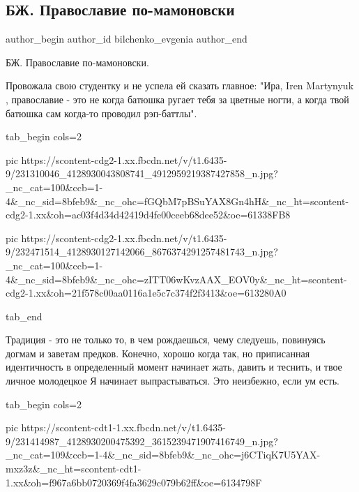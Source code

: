  
 
 
 
 
 
\subsection{БЖ. Православие по-мамоновски}
\label{sec:06_08_2021.fb.bilchenko_evgenia.3.pravoslavie_po_mamonovski}
 
\ifcmt
 author_begin
   author_id bilchenko_evgenia
 author_end
\fi

БЖ. Православие по-мамоновски.

Провожала свою студентку и не успела ей сказать главное: "Ира, Iren Martynyuk ,
православие - это не когда батюшка ругает тебя за цветные ногти, а когда твой
батюшка сам когда-то проводил рэп-баттлы".

\ifcmt
  tab_begin cols=2

     pic https://scontent-cdg2-1.xx.fbcdn.net/v/t1.6435-9/231310046_4128930043808741_4912959219387427858_n.jpg?_nc_cat=100&ccb=1-4&_nc_sid=8bfeb9&_nc_ohc=fGQbM7pBSuYAX8Gn4hH&_nc_ht=scontent-cdg2-1.xx&oh=ac03f4d34d42419d4fe00ceeb68dee52&oe=61338FB8

     pic https://scontent-cdg2-1.xx.fbcdn.net/v/t1.6435-9/232471514_4128930127142066_8676374291257481743_n.jpg?_nc_cat=100&ccb=1-4&_nc_sid=8bfeb9&_nc_ohc=zITT06wKvzAAX_EOV0y&_nc_ht=scontent-cdg2-1.xx&oh=21f578c00aa0116a1e5c7c374f2f3413&oe=613280A0

  tab_end
\fi

Традиция - это не только то, в чем рождаешься, чему следуешь, повинуясь догмам
и заветам предков. Конечно, хорошо когда так, но приписанная идентичность в
определенный момент начинает жать, давить и теснить, и твое личное молодецкое Я
начинает выпрастываться. Это неизбежно, если ум есть. 


\ifcmt
  tab_begin cols=2

     pic https://scontent-cdt1-1.xx.fbcdn.net/v/t1.6435-9/231414987_4128930200475392_3615239471907416749_n.jpg?_nc_cat=109&ccb=1-4&_nc_sid=8bfeb9&_nc_ohc=j6CTiqK7U5YAX-mxz3z&_nc_ht=scontent-cdt1-1.xx&oh=f967a6bb0720369f4fa3629c079b62ff&oe=6134798F

